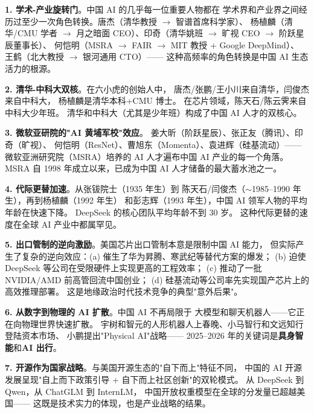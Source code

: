 \begin{corebox}[中国 AI 人才版图的七大特征]
\textbf{1. 学术-产业旋转门}。中国 AI 的几乎每一位重要人物都在
学术界和产业界之间经历过至少一次角色转换。唐杰（清华教授 $\to$ 智谱首席科学家）、
杨植麟（清华/CMU 学者 $\to$ 月之暗面 CEO）、印奇（清华姚班 $\to$ 旷视 CEO $\to$ 阶跃星辰董事长）、
何恺明（MSRA $\to$ FAIR $\to$ MIT 教授 + Google DeepMind）、
王鹤（北大教授 $\to$ 银河通用 CTO）——
这种高频率的角色转换是中国 AI 生态活力的根源。

\textbf{2. 清华-中科大双核}。在六小虎的创始人中，
唐杰/张鹏/王小川来自清华，闫俊杰来自中科大，
杨植麟是清华本科+CMU 博士。
在芯片领域，陈天石/陈云霁来自中科大少年班。
清华和中科大（尤其是少年班）构成了中国 AI 人才的双核心。

\textbf{3. 微软亚研院的"AI 黄埔军校"效应}。
姜大昕（阶跃星辰）、张正友（腾讯）、印奇（旷视）、
何恺明（ResNet）、曹旭东（Momenta）、袁进辉（硅基流动）——
微软亚洲研究院（MSRA）培养的 AI 人才遍布中国 AI 产业的每一个角落。
MSRA 自 1998 年成立以来，已成为中国 AI 人才储备的最大蓄水池之一。

\textbf{4. 代际更替加速}。从张钹院士（1935 年生）到
陈天石/闫俊杰（$\sim$1985--1990 年生），再到杨植麟（1992 年生）
和彭志辉（1993 年生），中国 AI 领军人物的平均年龄在快速下降。
DeepSeek 的核心团队平均年龄不到 30 岁。
这种代际更替的速度在全球 AI 产业中都属罕见。

\textbf{5. 出口管制的逆向激励}。美国芯片出口管制本意是限制中国 AI 能力，
但实际产生了复杂的逆向效应：(a) 催生了华为昇腾、寒武纪等替代方案的爆发；
(b) 迫使 DeepSeek 等公司在受限硬件上实现更高的工程效率；
(c) 推动了一批 NVIDIA/AMD 前高管回流中国创业；
(d) 硅基流动等公司率先实现国产芯片上的高效推理部署。
这是地缘政治时代技术竞争的典型"意外后果"。

\textbf{6. 从数字到物理的 AI 扩散}。中国 AI 不再局限于
大模型和聊天机器人——它正在向物理世界快速扩散。
宇树和智元的人形机器人上春晚、小马智行和文远知行登陆资本市场、
小鹏提出"Physical AI"战略——
2025--2026 年的关键词是\textbf{具身智能}和\textbf{AI 出行}。

\textbf{7. 开源作为国家战略}。与美国开源生态的"自下而上"特征不同，
中国的 AI 开源发展呈现"自上而下政策引导 + 自下而上社区创新"的双轮模式。
从 DeepSeek 到 Qwen，从 ChatGLM 到 InternLM，
中国开放权重模型在全球的分发量已超越美国——
这既是技术实力的体现，也是产业战略的结果。
\end{corebox}

